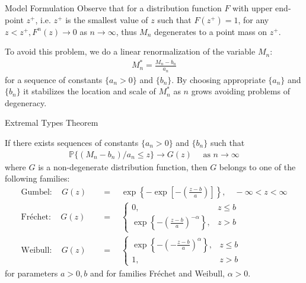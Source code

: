 \documentclass[10pt]{beamer}
\begin{document}
\begin{frame}{Model Formulation}
Observe that for a distribution function $F$ with upper end-point $z^+$, i.e. $z^+$ is the smallest value of $z$ such that $F(z^+) = 1$, for any $z<z^+, F^n(z) \to 0$ as $n \to \infty$, thus $M_n$ degenerates to a point mass on $z^+$. 

To avoid this problem, we do a linear renormalization of the variable $M_n$:
\begin{align*}
M_n^\ast = \frac{M_n - b_n}{a_n}
\end{align*}
for a sequence of constants $\{a_n>0\}$ and $\{b_n\}$. By choosing appropriate $\{a_n\}$ and $\{b_n\}$ it stabilizes the location and scale of $M_n^\ast$ as $n$ grows avoiding problems of degeneracy. %

\end{frame}

\begin{frame}{Extremal Types Theorem}
\begin{theorem}\label{thm:gfw}
If there exists sequences of constants $\{a_n>0\}$ and $\{b_n\}$ such that 
\begin{align*}
\mathbb{P}\{(M_n-b_n)/a_n \leq z\} \to G(z) \quad \text{ as } n \to \infty
\end{align*}
where $G$ is a non-degenerate distribution function, then $G$ belongs to one of the following families:
\begin{align*}
\text{Gumbel}:\quad G(z)\quad&= \quad\exp \left\{-\exp\left[-\left(\frac{z-b}{a}\right)\right]\right\}, \quad -\infty<z<\infty\\
\text{Fr\'echet}: \quad G(z)\quad&= \quad\begin{cases}
0, & z \leq b\\
\exp\left\{-\left(\frac{z-b}{a}\right)^{-\alpha}\right\}, &z >b
\end{cases}
\\
\text{Weibull}:\quad G(z)\quad&=  \quad\begin{cases}
\exp\left\{-\left(-\frac{z-b}{a}\right)^{\alpha}\right\}, & z \leq b\\
1, &z >b
\end{cases}
\end{align*}
for parameters $a>0, b$ and for families Fr\'echet and Weibull, $\alpha >0$.
\end{theorem}
\end{frame}
\end{document}
